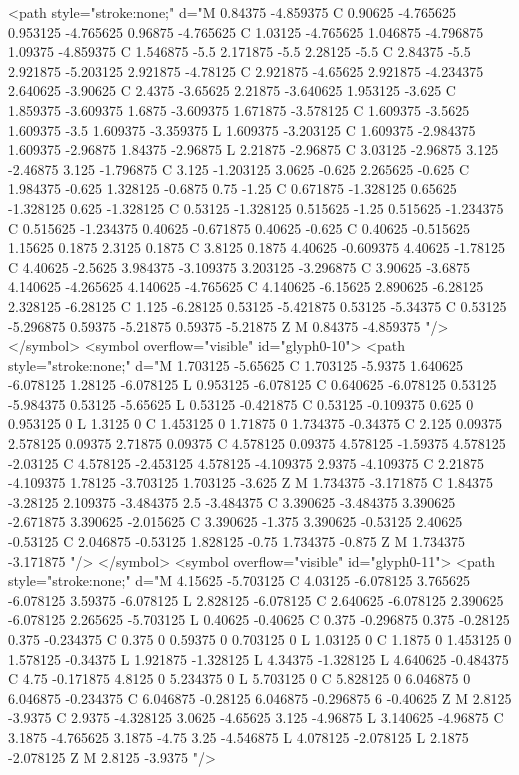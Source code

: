 <path style="stroke:none;" d="M 0.84375 -4.859375 C 0.90625 -4.765625 0.953125 -4.765625 0.96875 -4.765625 C 1.03125 -4.765625 1.046875 -4.796875 1.09375 -4.859375 C 1.546875 -5.5 2.171875 -5.5 2.28125 -5.5 C 2.84375 -5.5 2.921875 -5.203125 2.921875 -4.78125 C 2.921875 -4.65625 2.921875 -4.234375 2.640625 -3.90625 C 2.4375 -3.65625 2.21875 -3.640625 1.953125 -3.625 C 1.859375 -3.609375 1.6875 -3.609375 1.671875 -3.578125 C 1.609375 -3.5625 1.609375 -3.5 1.609375 -3.359375 L 1.609375 -3.203125 C 1.609375 -2.984375 1.609375 -2.96875 1.84375 -2.96875 L 2.21875 -2.96875 C 3.03125 -2.96875 3.125 -2.46875 3.125 -1.796875 C 3.125 -1.203125 3.0625 -0.625 2.265625 -0.625 C 1.984375 -0.625 1.328125 -0.6875 0.75 -1.25 C 0.671875 -1.328125 0.65625 -1.328125 0.625 -1.328125 C 0.53125 -1.328125 0.515625 -1.25 0.515625 -1.234375 C 0.515625 -1.234375 0.40625 -0.671875 0.40625 -0.625 C 0.40625 -0.515625 1.15625 0.1875 2.3125 0.1875 C 3.8125 0.1875 4.40625 -0.609375 4.40625 -1.78125 C 4.40625 -2.5625 3.984375 -3.109375 3.203125 -3.296875 C 3.90625 -3.6875 4.140625 -4.265625 4.140625 -4.765625 C 4.140625 -6.15625 2.890625 -6.28125 2.328125 -6.28125 C 1.125 -6.28125 0.53125 -5.421875 0.53125 -5.34375 C 0.53125 -5.296875 0.59375 -5.21875 0.59375 -5.21875 Z M 0.84375 -4.859375 "/>
</symbol>
<symbol overflow="visible" id="glyph0-10">
<path style="stroke:none;" d="M 1.703125 -5.65625 C 1.703125 -5.9375 1.640625 -6.078125 1.28125 -6.078125 L 0.953125 -6.078125 C 0.640625 -6.078125 0.53125 -5.984375 0.53125 -5.65625 L 0.53125 -0.421875 C 0.53125 -0.109375 0.625 0 0.953125 0 L 1.3125 0 C 1.453125 0 1.71875 0 1.734375 -0.34375 C 2.125 0.09375 2.578125 0.09375 2.71875 0.09375 C 4.578125 0.09375 4.578125 -1.59375 4.578125 -2.03125 C 4.578125 -2.453125 4.578125 -4.109375 2.9375 -4.109375 C 2.21875 -4.109375 1.78125 -3.703125 1.703125 -3.625 Z M 1.734375 -3.171875 C 1.84375 -3.28125 2.109375 -3.484375 2.5 -3.484375 C 3.390625 -3.484375 3.390625 -2.671875 3.390625 -2.015625 C 3.390625 -1.375 3.390625 -0.53125 2.40625 -0.53125 C 2.046875 -0.53125 1.828125 -0.75 1.734375 -0.875 Z M 1.734375 -3.171875 "/>
</symbol>
<symbol overflow="visible" id="glyph0-11">
<path style="stroke:none;" d="M 4.15625 -5.703125 C 4.03125 -6.078125 3.765625 -6.078125 3.59375 -6.078125 L 2.828125 -6.078125 C 2.640625 -6.078125 2.390625 -6.078125 2.265625 -5.703125 L 0.40625 -0.40625 C 0.375 -0.296875 0.375 -0.28125 0.375 -0.234375 C 0.375 0 0.59375 0 0.703125 0 L 1.03125 0 C 1.1875 0 1.453125 0 1.578125 -0.34375 L 1.921875 -1.328125 L 4.34375 -1.328125 L 4.640625 -0.484375 C 4.75 -0.171875 4.8125 0 5.234375 0 L 5.703125 0 C 5.828125 0 6.046875 0 6.046875 -0.234375 C 6.046875 -0.28125 6.046875 -0.296875 6 -0.40625 Z M 2.8125 -3.9375 C 2.9375 -4.328125 3.0625 -4.65625 3.125 -4.96875 L 3.140625 -4.96875 C 3.1875 -4.765625 3.1875 -4.75 3.25 -4.546875 L 4.078125 -2.078125 L 2.1875 -2.078125 Z M 2.8125 -3.9375 "/>
